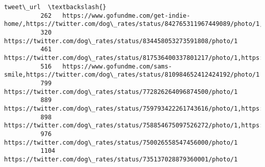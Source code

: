 \documentclass[11pt]{article}
\begin{document}
\begin{Verbatim}[commandchars=\\\{\}]
                                                                                                                                                                                                                                                                      tweet\_url  \textbackslash{}
          262   https://www.gofundme.com/get-indie-home/,https://twitter.com/dog\_rates/status/842765311967449089/photo/1,https://twitter.com/dog\_rates/status/842765311967449089/photo/1                                                                                          
          320   https://twitter.com/dog\_rates/status/834458053273591808/photo/1                                                                                                                                                                                                   
          461   https://twitter.com/dog\_rates/status/817536400337801217/photo/1,https://twitter.com/dog\_rates/status/817536400337801217/photo/1,https://twitter.com/dog\_rates/status/817536400337801217/photo/1,https://twitter.com/dog\_rates/status/817536400337801217/photo/1   
          516   https://www.gofundme.com/sams-smile,https://twitter.com/dog\_rates/status/810984652412424192/photo/1                                                                                                                                                               
          799   https://twitter.com/dog\_rates/status/772826264096874500/photo/1                                                                                                                                                                                                   
          889   https://twitter.com/dog\_rates/status/759793422261743616/photo/1,https://twitter.com/dog\_rates/status/759793422261743616/photo/1                                                                                                                                   
          898   https://twitter.com/dog\_rates/status/758854675097526272/photo/1,https://twitter.com/dog\_rates/status/758854675097526272/photo/1,https://twitter.com/dog\_rates/status/758854675097526272/photo/1,https://twitter.com/dog\_rates/status/758854675097526272/photo/1   
          976   https://twitter.com/dog\_rates/status/750026558547456000/photo/1                                                                                                                                                                                                   
          1104  https://twitter.com/dog\_rates/status/735137028879360001/photo/1                                                                                                                                                                                                   

\end{Verbatim}
\end{document}

